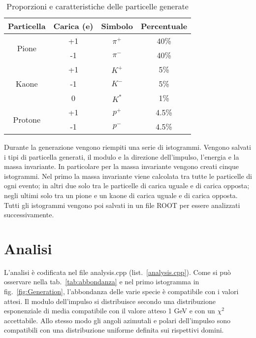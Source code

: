 \documentclass[a4paper,10pt]{article}
\begin{document}
\begin{table*}
  \caption{Proporzioni e caratteristiche delle particelle generate}
  \label{tab:proporzioni}
  \centering
  \begin{tabular}{cccc}
    \toprule
    Particella               & Carica (e) & Simbolo & Percentuale \\
    \midrule
    \multirow{2}{*}{Pione}   & +1         & $\pi^+$ & 40\%        \\
                             & -1         & $\pi^-$ & 40\%        \\
    \midrule
    \multirow{3}{*}{Kaone}   & +1         & $K^+$   & 5\%         \\
                             & -1         & $K^-$   & 5\%         \\
                             & 0          & $K^*$   & 1\%         \\
    \midrule
    \multirow{2}{*}{Protone} & +1         & $p^+$   & 4.5\%       \\
                             & -1         & $p^-$   & 4.5\%       \\
    \bottomrule
  \end{tabular}
\end{table*}

Durante la generazione vengono riempiti una serie di istogrammi. Vengono salvati i tipi di particella generati, il modulo e la direzione dell'impulso, l'energia e la massa invariante. In particolare per la massa invariante vengono creati cinque istogrammi. Nel primo la massa invariante viene calcolata tra tutte le particelle di ogni evento; in altri due solo tra le particelle di carica uguale e di carica opposta; negli ultimi solo tra un pione e un kaone di carica uguale e di carica opposta. Tutti gli istogrammi vengono poi salvati in un file ROOT per essere analizzati successivamente.

\section{Analisi}
L'analisi è codificata nel file analysis.cpp (list.~\ref{analysis.cpp}). Come si può osservare nella tab.~\ref{tab:abbondanza} e nel primo istogramma in fig.~\ref{fig:Generation}, l'abbondanza delle varie specie è compatibile con i valori attesi. Il modulo dell'impulso si distribuisce secondo una distribuzione esponenziale di media compatibile con il valore atteso 1 GeV e con un $\chi^2$ accettabile. Allo stesso modo gli angoli azimutali e polari dell'impulso sono compatibili con una distribuzione uniforme definita sui rispettivi domini.
\end{document}
